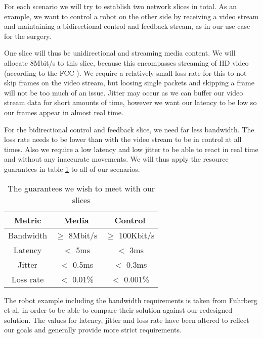 
For each scenario we will try to establish two network slices in total. As an example, we want to control a robot on the other side by receiving a video stream and maintaining a bidirectional control and feedback stream, as in our use case for the surgery.

One slice will thus be unidirectional and streaming media content. We will allocate 8Mbit/s to this slice, because this encompasses streaming of HD video (according to the FCC \cite{fcc}). We require a relatively small loss rate for this to not skip frames on the video stream, but loosing single packets and skipping a frame will not be too much of an issue. Jitter may occur as we can buffer our video stream data for short amounts of time, however we want our latency to be low so our frames appear in almost real time.

For the bidirectional control and feedback slice, we need far less bandwidth. The loss rate needs to be lower than with the video stream to be in control at all times. Also we require a low latency and low jitter to be able to react in real time and without any inaccurate movements. We will thus apply the resource guarantees in table \ref{table:slices} to all of our scenarios.

\begin{table}[ht]
    \centering
    \begin{tabular}{ |c|c|c| }
    \hline
    \textbf{Metric} & \textbf{Media} & \textbf{Control} \\
    \hline
         Bandwidth & $\geq$ 8Mbit/s & $\geq$ 100Kbit/s \\
         Latency   & $<$ 5ms     & $<$ 3ms      \\
         Jitter    & $<$ 0.5ms  & $<$ 0.3ms   \\
         Loss rate & $<$ 0.01\% & $<$ 0.001\% \\
    \hline
    \end{tabular}
    \caption{The guarantees we wish to meet with our slices}
    \label{table:slices}
\end{table}

The robot example including the bandwidth requirements is taken from Fuhrberg et al. \cite{SE4} in order to be able to compare their solution against our redesigned solution. The values for latency, jitter and loss rate have been altered to reflect our goals and generally provide more strict requirements.

